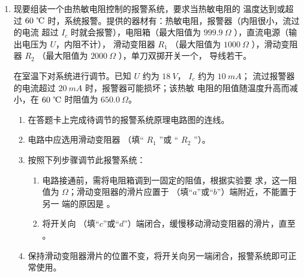 \begin{enumerate}
\item
{}
现要组装一个由热敏电阻控制的报警系统，要求当热敏电阻的
温度达到或超过 $ 60 \ \celsius $ 时，系统报警。提供的器材有：热敏电阻，报警器（内阻很小，流过的电流
超过 $ I_{c} $ 时就会报警），电阻箱（最大阻值为 $ 999.9 \ \Omega $ ），直流电源（输出电压为 $ U $，内阻不计），
滑动变阻器 $ R_{1} $ （最大阻值为 $ 1000 \ \Omega $ ），滑动变阻器 $ R_{2} $ （最大阻值为 $ 2000 \ \Omega $ ），单刀双掷开关一个，
导线若干。
\begin{figure}[h!]
\centering

\end{figure}

在室温下对系统进行调节。已知 $ U $ 约为 $ 18 \ V $， $ I_{c} $ 约为 $ 10 \ mA $；
流过报警器的电流超过 $ 20 \ mA $ 时，报警器可能损坏；该热敏
电阻的阻值随温度升高而减小，在 $ 60 \ \celsius $ 时阻值为 $ 650.0 \ \Omega $。

\begin{enumerate}
\item
在答题卡上完成待调节的报警系统原理电路图的连线。

\item 
电路中应选用滑动变阻器 \underlinegap （填“ $ R_{1} $ ”或
“ $ R_{2} $ ”）。

\item 
按照下列步骤调节此报警系统：
\begin{enumerate}
\item
电路接通前，需将电阻箱调到一固定的阻值，根据实验要
求，这一阻值为 \underlinegap $ \Omega $；滑动变阻器的滑片应置于 \underlinegap （填“$ a $”或“$ b $”）端附近，不能置于另一
端的原因是 \hfullline 。


\item 
将开关向 \underlinegap （填“$ c $”或“$ d $”）端闭合，缓慢移动滑动变阻器的滑片，直至 \hfullline 
。

\end{enumerate}


\item 
保持滑动变阻器滑片的位置不变，将开关向另一端闭合，报警系统即可正常使用。





\end{enumerate}
\end{enumerate}
